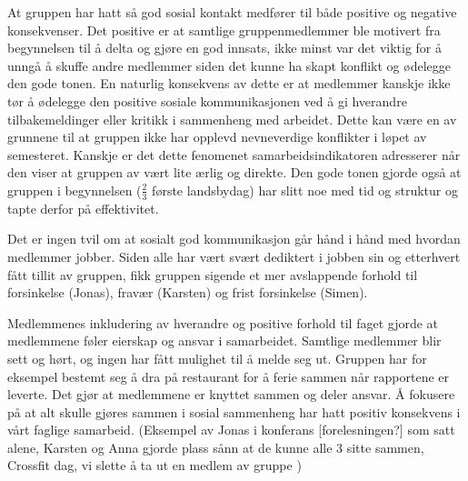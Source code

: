At gruppen har hatt så god sosial kontakt medfører til både positive og negative konsekvenser.
Det positive er at samtlige gruppenmedlemmer ble motivert fra begynnelsen til å delta og gjøre en god innsats, ikke minst var det viktig for å unngå å skuffe andre medlemmer siden det kunne ha skapt konflikt og ødelegge den gode tonen.
En naturlig konsekvens av dette er at medlemmer kanskje ikke tør å ødelegge den positive sosiale kommunikasjonen ved å gi hverandre tilbakemeldinger eller kritikk i sammenheng med arbeidet.
Dette kan være en av grunnene til at gruppen ikke har opplevd nevneverdige konflikter i løpet av semesteret.
Kanskje er det dette fenomenet samarbeidsindikatoren adresserer når den viser at gruppen av vært lite ærlig og direkte.
Den gode tonen gjorde også at gruppen i begynnelsen ($\frac{2}{3}$ første landsbydag) har slitt noe med tid og struktur og tapte derfor på effektivitet.

Det er ingen tvil om at sosialt god kommunikasjon går hånd i hånd med hvordan medlemmer jobber.
Siden alle har vært svært dediktert i jobben sin og etterhvert fått tillit av gruppen, fikk gruppen sigende et mer avslappende forhold til forsinkelse (Jonas), fravær (Karsten) og frist forsinkelse (Simen). 

Medlemmenes inkludering av hverandre og positive forhold til faget gjorde at medlemmene føler eierskap og ansvar i samarbeidet.
Samtlige medlemmer blir sett og hørt, og ingen har fått mulighet til å melde seg ut.
Gruppen har for eksempel bestemt seg å dra på restaurant for å ferie sammen når rapportene er leverte. 
Det gjør at medlemmene er knyttet sammen og deler ansvar.
Å fokusere på at alt skulle gjøres sammen i sosial sammenheng har hatt positiv konsekvens i vårt faglige samarbeid.
\iffalse
(Eksempel av Jonas i konferans [forelesningen?] som satt alene, Karsten og Anna gjorde plass sånn at de kunne alle 3 sitte sammen, Crossfit dag, vi slette å ta ut en medlem av gruppe )



